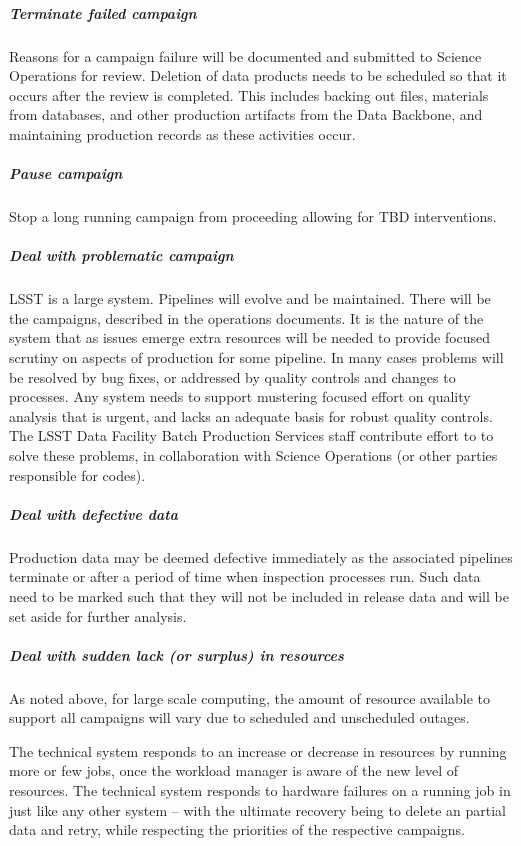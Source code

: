 \subparagraph{Terminate failed campaign}
Reasons for a campaign failure will be documented and submitted to Science
Operations for review. Deletion of data products needs to be scheduled so that
it occurs after the review is completed. This includes backing out files, materials
from databases, and other production artifacts from the Data Backbone, and
maintaining production records as these activities occur.

\subparagraph{Pause campaign}
Stop a long running campaign from proceeding allowing for TBD interventions.

\subparagraph{Deal with problematic campaign}
LSST is a large system. Pipelines will evolve and be maintained. There will be
the campaigns, described in the operations documents. It is the nature of the
system that as issues emerge extra resources will be needed to provide focused
scrutiny on aspects of production for some pipeline. In many cases problems will
be resolved by bug fixes, or addressed by quality controls and changes to
processes. Any system needs to support mustering focused effort on quality
analysis that is urgent, and lacks an adequate basis for robust quality controls.
The LSST Data Facility Batch Production Services staff contribute effort to to solve
these problems, in collaboration with Science Operations (or other parties
responsible for codes).

\subparagraph{Deal with defective data}
Production data may be deemed defective immediately as the associated pipelines
terminate or after a period of time when inspection processes run. Such data need
to be marked such that they will not be included in release data and will be set aside
for further analysis.

\subparagraph{Deal with sudden lack (or surplus) in resources}
As noted above, for large scale computing, the amount of resource available to
support all campaigns will vary due to scheduled and unscheduled outages.

The technical system responds to an increase or decrease in resources by running
more or few jobs, once the workload manager is aware of the new level of
resources. The technical system responds to hardware failures on a running job
in just like any other system -- with the ultimate recovery being to  delete an
partial data and retry, while respecting the priorities of the respective campaigns.

